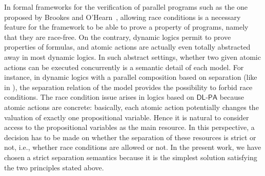 \documentclass{llncs}
\newcommand{\pll}{ {||} }							%
\newcommand{\testendo}{?\!\!?}			%
\newcommand{\Dlpa}{\ensuremath{\mathsf{DL\text{-}PA}}\xspace}
\newcommand{\ah}[1]{\**\marginpar{\textbf{AH:} #1}}
\newcommand{\lbox}[1]{ \big[ #1 \big] }
\renewcommand{\phi}{\varphi}
\begin{document}


In formal frameworks for the verification of parallel programs such as the one proposed by Brookes 
and O'Hearn~\cite{Brookes04,OHearn04}, allowing race conditions is a necessary feature for the 
framework to be able to prove a property of programs, namely that they are race-free. 
On the contrary, dynamic logics permit to prove properties of formulas, and atomic actions are actually even totally abstracted away in most dynamic logics. 
In such abstract settings,
whether two given atomic actions can be executed concurrently is a semantic detail of each model.
For instance, in dynamic logics with a parallel composition based on separation (like in
\cite{DBLP:journals/entcs/BenevidesFV11,Boudou16,DBLP:journals/logcom/BalbianiB18}),
the separation relation of the model provides the possibility to forbid race conditions.
The race condition issue arises in logics based on \Dlpa because atomic actions are concrete:
basically, each atomic action potentially changes the valuation of exactly one propositional variable.
Hence it is natural to consider access to the propositional variables as the main resource. 
In this perspective, a decision has to be made on whether the separation of these resources is strict or not, 
i.e., whether race conditions are allowed or not.
In the present work, we have chosen a strict separation semantics because it is the simplest solution satisfying
the two principles stated above.
\end{document}
